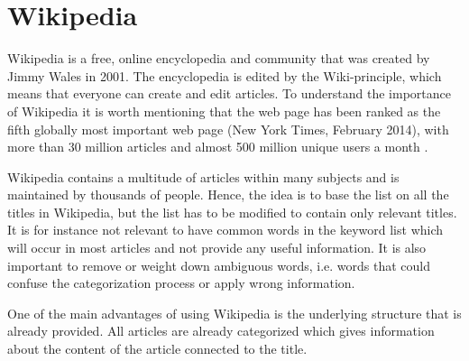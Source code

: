 \section{Wikipedia}
Wikipedia is a free, online encyclopedia and community that was created by Jimmy Wales in 2001. The encyclopedia is edited by the Wiki-principle, which means that everyone can create and edit articles. To understand the importance of Wikipedia it is worth mentioning that the web page has been ranked as the fifth globally most important web page (New York Times, February 2014), with  more than 30 million articles and almost 500 million unique users a month \cite{wiki:wikipedia}. 

Wikipedia contains a multitude of articles within many subjects and is maintained by thousands of people. 
Hence, the idea is to base the list on all the titles in Wikipedia, but the list has to be modified to contain only relevant titles. It is for instance not relevant to have common words in the keyword list which will occur in most articles and not provide any useful information. 
It is also important to remove or weight down ambiguous words, i.e. words that could confuse the categorization process or apply wrong information. 

One of the main advantages of using Wikipedia is the underlying structure that is already provided. All articles are already categorized which gives information about the content of the article connected to the title. 


